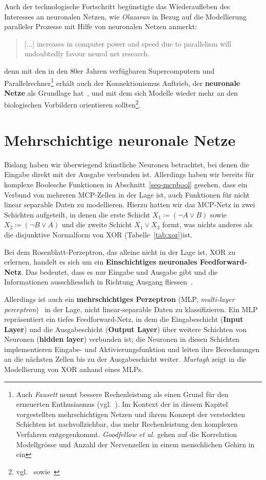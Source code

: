 Auch der technologische Fortschritt begünstigte das Wiederaufleben des Interesses an neuronalen Netzen, wie \textit{Olazaran} in Bezug auf die Modellierung paralleler Prozesse mit Hilfe von neuronalen Netzen anmerkt:

\blockquote[{\cite[644]{Ola96}}]{
    [...] increases in computer power and speed due to parallelism will undoubtedly favour neural net research.
}

denn mit den in den 80er Jahren verfügbaren Supercomputern und Parallelrechner\footnote{
    Auch \textit{Fausett} nennt bessere Rechenleistung als einen Grund für den erneuerten Enthusiasmus (vgl.~\cite[26]{Fau94}). Im Kontext der in diesem Kapitel vorgestellten mehrschichtigen Netzen und ihrem Konzept der versteckten Schichten ist nachvollziehbar, das mehr Rechenleistung den komplexen Verfahren entgegenkommt. \textit{Goodfellow et al.} gehen auf die Korrelation Modellgrösse und Anzahl der Nervenzellen in einem menschlichen Gehirn in~\cite[24 f.]{GBC18} ein
} erhält auch der Konnektionismus Auftrieb, der \textbf{neuronale Netze} als Grundlage hat~\cite[15]{Dor91}, und mit dem sich Modelle wieder mehr an den biologischen Vorbildern orientieren sollten\footnote{
    vgl.~\cite[43]{RM87} sowie~\cite[18 f.]{GBC18}}.


\section{Mehrschichtige neuronale Netze}

Bislang haben wir überwiegend künstliche Neuronen betrachtet, bei denen die Eingabe direkt mit der Ausgabe verbunden ist. Allerdings haben wir bereits für komplexe Boolesche Funktionen in Abschnitt~\ref{seq-mcpbool} gesehen, dass ein Verbund von mehreren MCP-Zellen in der Lage ist, auch Funktionen für nicht linear separable Daten zu modellieren. Hierzu hatten wir das MCP-Netz in zwei Schichten aufgeteilt, in denen die erste Schicht $X_1 \coloneqq (\neg A \lor B)$ sowie $X_2 \coloneqq (\neg B \lor A)$ und die zweite Schicht $X_1 \lor X_2$ formt, was nichts anderes als die disjunktive Normalform von XOR (Tabelle~\ref{tab:xor})ist.

Bei dem Rosenblatt-Perzeptron, das alleine nicht in der Lage ist, XOR zu erlernen, handelt es sich um ein \textbf{Einschichtiges neuronales Feedforward-Netz}.
Das bedeutet, dass es nur Eingabe und Ausgabe gibt und die Informationen ausschliesslich in Richtung Ausgang fliessen~\cite[848]{RN09}.

Allerdings ist auch ein \textbf{mehrschichtiges Perzeptron} (MLP, \textit{multi-layer perceptron})~\cite[6]{GBC18} in der Lage, nicht linear-separable Daten zu klassifizieren.
Ein MLP repräsentiert ein tiefes Feedforward-Netz, in dem die Eingabeschicht (\textbf{Input Layer}) und die Ausgabeschicht (\textbf{Output Layer}) über weitere Schichten von Neuronen (\textbf{hidden layer}) verbunden ist; die Neuronen in diesen Schichten implementieren Eingabe- und Aktivierungsfunktion und leiten ihre Berechnungen an die nächsten Zellen bis zu der Ausgabeschicht weiter. \textit{Murtagh} zeigt in \cite[184 f.]{Mur91} die Modellierung von XOR anhand eines MLPs.

